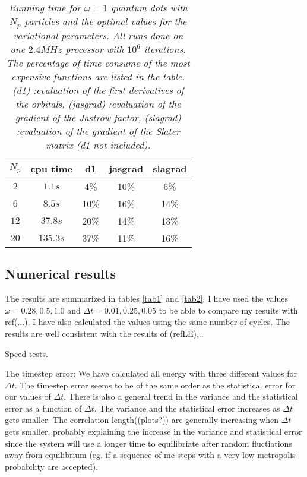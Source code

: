 \documentclass[a4paper,10pt,twocolumn]{article} %
\newcommand{\expec}[1]{\langle{}{#1}\rangle{}}
\begin{document}
\begin{table}[h!]
\begin{center}
\begin{tabular}{|c|c|c|c|c|}
\hline
$N_{p}$ & cpu time & d1  & jasgrad  & slagrad  \\ 
\hline
\hline
 $2$  & $1.1s$ &4\% &10\% &6\%\\ 
 $6$  & $8.5s$ & 10\% &16\% &14\%\\ 
 $12$ & $37.8s$ & 20\% &14\% &13\%\\ 
 $20$ & $135.3s$ & 37\% &11\% &16\%\\ 
\hline
\end{tabular}
\end{center}
\caption{{\it 
	Running time for $\omega=1$ quantum dots with $N_p$ particles and the optimal values for the variational parameters. All runs done on one $2.4 MHz$ processor with $10^6$ iterations.
	The percentage of time consume of the most expensive functions are listed in the table. 
	(d1) :evaluation of the first derivatives of the orbitals,
	(jasgrad)  :evaluation of the gradient of the Jastrow factor,
	(slagrad)  :evaluation of the gradient of the Slater matrix (d1 not included).
}}
\label{tab:scaletime}
\end{table}

\subsection{Numerical results}

The results are summarized in tables \ref{tab1} and \ref{tab2}. I have used the values $\omega=0.28,0.5,1.0$ and $\Delta t = 0.01,0.25,0.05$ to be able to compare my 
results with ref(...). I have also calculated the values using the same number of cycles. The results are well consistent with the results of (refLE),..

Speed tests.


The timestep error: We have calculated all energy with three different values for $\Delta t$. 
The timestep error seems to be of the same order as the statistical error for our values of $\Delta t$. 
There is also a general trend in the variance and the statistical error as a function of $\Delta t$. The variance and the statistical error increases as $\Delta t$ gets smaller.
The correlation length((plots?)) are generally increasing when $\Delta t$ gets smaller, probably explaining the increase in the variance and statistical error since the system will use a longer
time to equilibriate after random fluctiations away from equilibrium (eg. if a sequence of mc-steps with a very low metropolis probability are accepted).
%
\end{document}
